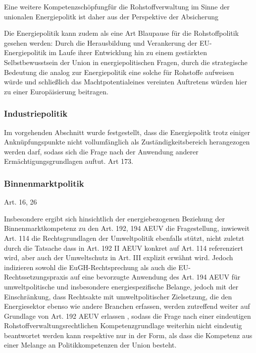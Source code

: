 \documentclass[12pt,a4paper,oneside]{book} %
\begin{document}
{	Eine weitere \glqq Kompetenzschöpfung\grqq für die Rohstoffverwaltung im Sinne der unionalen Energiepolitk ist daher aus der Perspektive der Absicherung 
	
	Die Energiepolitik kann zudem als eine Art Blaupause für die Rohstoffpolitik gesehen werden: Durch die Herausbildung und Verankerung der EU-Energiepolitik im Laufe ihrer Entwicklung hin zu einem gestärkten Selbstbewusstsein der Union in energiepolitischen Fragen, durch die strategische Bedeutung die analog zur Energiepolitik eine solche für Rohstoffe aufweisen würde und schließlich das \glqq Machtpotential\grqq eines vereinten Auftretens würden hier zu einer Europäisierung beitragen.\autocite[Nettesheim, Art. 194 Rn 44]{grabitz_recht_2024}
	
	\subsubsection{Industriepolitik}
	Im vorgehenden Abschnitt wurde festgestellt, dass die Energiepolitk trotz einiger Anknüpfungspunkte nicht vollumfänglich als Zuständigkeitsbereich herangezogen werden darf, sodass sich die Frage nach der Anwendung anderer Ermächtigungsgrundlagen auftut.
	Art 173.
	
	\subsubsection{Binnenmarktpolitik}
	Art. 16, 26
	
	Insbesondere ergibt sich hinsichtlich der energiebezogenen Beziehung der Binnenmarktkompetenz zu den Art. 192, 194 AEUV die Fragestellung, inwieweit Art. 114 die Rechtsgrundlagen der Umweltpolitik ebenfalls stützt, nicht zuletzt durch die Tatsache dass in Art. 192 II AEUV konkret auf Art. 114 referenziert wird, aber auch der Umweltschutz in Art. III explizit erwähnt wird.\autocite[siehe insbesondere hierzu Gundel §m Rn 28f]{dauses_handbuch_2024} Jedoch indizieren sowohl die EuGH-Rechtsprechung als auch die EU-Rechtssetzungspraxis auf eine bevorzugte Anwendung des Art. 194 AEUV für umweltpolitische und insbesondere energiespezifische Belange, jedoch mit der Einschränkung, dass \glqq Rechtsakte mit umweltpolitischer Zielsetzung, die den Energiesektor ebenso wie andere Branchen erfassen, werden zutreffend weiter auf Grundlage von Art. 192 AEUV erlassen \grqq\autocite[Gundel §m Rn 29]{dauses_handbuch_2024}, sodass die Frage nach einer eindeutigen Rohstoffverwaltungsrechtlichen Kompetenzgrundlage weiterhin nicht eindeutig beantwortet werden kann respektive nur in der Form, als dass die Kompetenz aus einer Melange an Politikkompetenzen der Union besteht.
	
}
\end{document}
